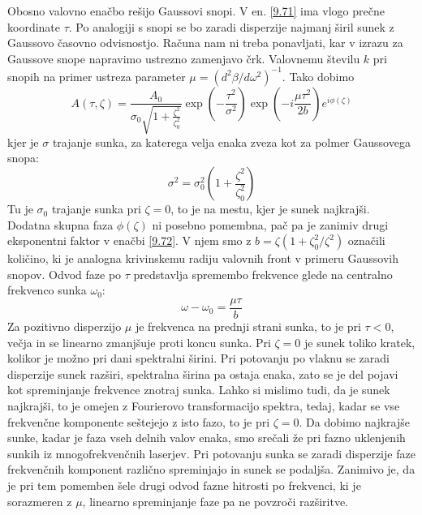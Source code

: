 \documentclass[11pt,fleqn]{book} %
\begin{document}
Obosno valovno enačbo rešijo Gaussovi snopi. V en. \ref{9.71} ima
vlogo prečne koordinate $\tau.$ Po analogiji s snopi se bo zaradi
disperzije najmanj širil sunek z Gaussovo časovno odvisnostjo. Računa
nam ni treba ponavljati, kar v izrazu za Gaussove snope napravimo
ustrezno zamenjavo črk. Valovnemu številu $k$ pri snopih na primer
ustreza parameter $\mu=(d^{2}\beta/d\omega^{2})^{-1}$. Tako dobimo
\begin{equation}
A\left(\tau,\zeta\right)=\frac{A_{0}}{\sigma_{0}\sqrt{1+\frac{\zeta^{2}}{\zeta_{0}^{2}}}}\exp\left(-\frac{\tau^{2}}{\sigma^{2}}\right)\exp\left(-i\frac{\mu\tau^{2}}{2b}\right)e^{i\phi\left(\zeta\right)}\label{9.72}
\end{equation}
 kjer je $\sigma$ trajanje sunka, za katerega velja enaka zveza kot
za polmer Gaussovega snopa: 
\begin{equation}
\sigma^{2}=\sigma_{0}^{2}\left(1+\frac{\zeta^{2}}{\zeta_{0}^{2}}\right)\label{9.73}
\end{equation}
 Tu je $\sigma_{0}$ trajanje sunka pri $\zeta=0$, to je na mestu,
kjer je sunek najkrajši. Dodatna skupna faza $\phi\left(\zeta\right)$
ni posebno pomembna, pač pa je zanimiv drugi eksponentni faktor v
enačbi \ref{9.72}. V njem smo z $b=\zeta\left(1+\zeta_{0}^{2}/\zeta^{2}\right)$
označili količino, ki je analogna krivinskemu radiju valovnih front
v primeru Gaussovih snopov. Odvod faze po $\tau$ predstavlja spremembo
frekvence glede na centralno frekvenco sunka $\omega_{0}$: 
\begin{equation}
\omega-\omega_{0}=\frac{\mu\tau}{b}\label{9.74}
\end{equation}
 Za pozitivno disperzijo $\mu$ je frekvenca na prednji strani sunka,
to je pri $\tau<0$, večja in se linearno zmanjšuje proti koncu sunka.
Pri $\zeta=0$ je sunek toliko kratek, kolikor je možno pri dani spektralni
širini. Pri potovanju po vlaknu se zaradi disperzije sunek razširi,
spektralna širina pa ostaja enaka, zato se je del pojavi kot spreminjanje
frekvence znotraj sunka. Lahko si mislimo tudi, da je sunek najkrajši,
to je omejen z Fourierovo transformacijo spektra, tedaj, kadar se
vse frekvenčne komponente seštejejo z isto fazo, to je pri $\zeta=0$.
Da dobimo najkrajše sunke, kadar je faza vseh delnih valov enaka,
smo srečali že pri fazno uklenjenih sunkih iz mnogofrekvenčnih laserjev.
Pri potovanju sunka se zaradi disperzije faze frekvenčnih komponent
različno spreminjajo in sunek se podaljša. Zanimivo je, da je pri
tem pomemben šele drugi odvod fazne hitrosti po frekvenci, ki je sorazmeren
z $\mu$, linearno spreminjanje faze pa ne povzroči razširitve.
\end{document}
